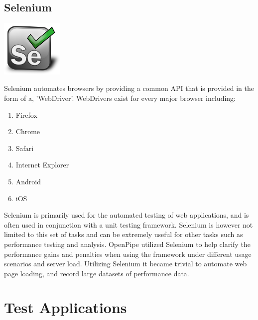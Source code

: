 \documentclass[12pt]{report}
\begin{document}
\section{Selenium}
\begin{center}
\includegraphics[width=30mm]{figures/images/selenium_logo.png}
\end{center}

Selenium automates browsers by providing a common API that is provided in the form of a, 'WebDriver'. WebDrivers exist for every major browser including:

\begin{enumerate}
\item Firefox
\item Chrome
\item Safari
\item Internet Explorer
\item Android
\item iOS
\end{enumerate}

Selenium is primarily used for the automated testing of web applications, and is often used in conjunction with a unit testing framework.  Selenium is however not limited to this set of tasks and can be extremely useful for other tasks such as performance testing and analysis. OpenPipe utilized Selenium to help clarify the performance gains and penalties when using the framework under different usage scenarios and server load. Utilizing Selenium it became trivial to automate web page loading, and record large datasets of performance data.







\chapter{Test Applications}
\end{document}
